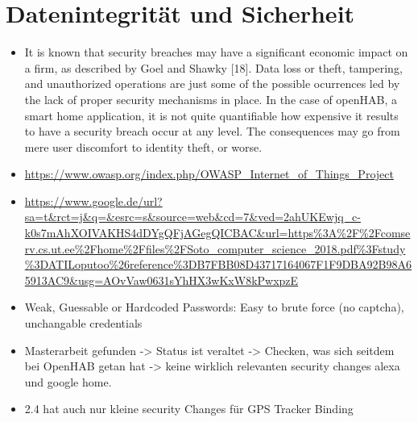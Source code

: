 \section{Datenintegrität und Sicherheit}
\begin{itemize}
	 \item It is known that security breaches may have a significant economic impact on a firm, as
	 described by Goel and Shawky [18]. Data loss or theft, tampering, and unauthorized
	 operations are just some of the possible ocurrences led by the lack of proper security
	 mechanisms in place. In the case of openHAB, a smart home application, it is not quite
	 quantifiable how expensive it results to have a security breach occur at any level. The
	 consequences may go from mere user discomfort to identity theft, or worse.
	\item \url{https://www.owasp.org/index.php/OWASP_Internet_of_Things_Project}
	\item \url{https://www.google.de/url?sa=t&rct=j&q=&esrc=s&source=web&cd=7&ved=2ahUKEwjq_c-k0s7mAhXOIVAKHS4dDYgQFjAGegQICBAC&url=https%3A%2F%2Fcomserv.cs.ut.ee%2Fhome%2Ffiles%2FSoto_computer_science_2018.pdf%3Fstudy%3DATILoputoo%26reference%3DB7FBB08D43717164067F1F9DBA92B98A65913AC9&usg=AOvVaw0631sYhHX3wKxW8kPwxpzE}
	\item Weak, Guessable or Hardcoded Passwords: Easy to brute force (no captcha), unchangable credentials
	\item Masterarbeit gefunden -> Status ist veraltet -> Checken, was sich seitdem bei OpenHAB getan hat -> keine wirklich relevanten security changes alexa und google home.
	\item 2.4 hat auch nur kleine security Changes für GPS Tracker Binding
\end{itemize}
